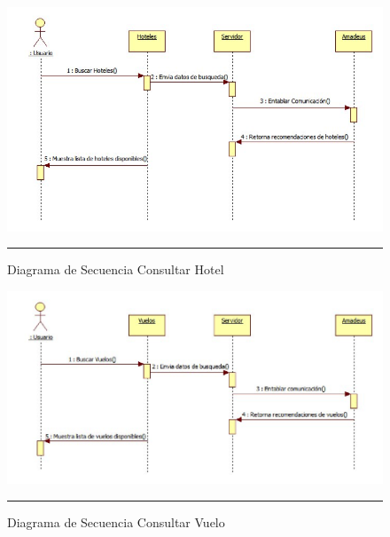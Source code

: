 \begin{figure}[H]
	\centering
		\includegraphics[width=1\textwidth]{Figuras/secConsultarHotel.png}
		\rule{30em}{0.5pt}
	\caption[Diagrama de Secuencia Consultar Hotel]{Diagrama de Secuencia Consultar Hotel}
	\label{fig:secConsultarHotel}
\end{figure}

\begin{figure}[H]
	\centering
		\includegraphics[width=1\textwidth]{Figuras/secConsultarVuelo.png}
		\rule{30em}{0.5pt}
	\caption[Diagrama de Secuencia Consultar Vuelo]{Diagrama de Secuencia Consultar Vuelo}
	\label{fig:secConsultarVuelo}
\end{figure}

